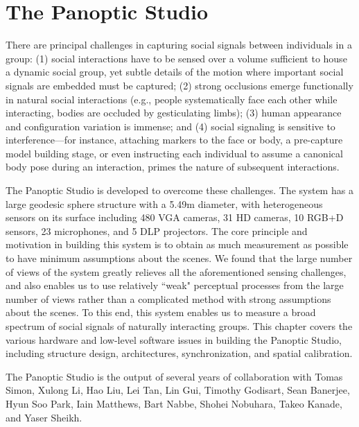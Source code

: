 \chapter{The Panoptic Studio}%
\label{chapter:system}

There are principal challenges in capturing social signals between individuals in a group: (1) social interactions have to be sensed over a volume sufficient to house a dynamic social group, yet subtle details of the motion where important social signals are embedded must be captured; (2) strong occlusions emerge functionally in natural social interactions (e.g., people systematically face each other while interacting, bodies are occluded by gesticulating limbs); (3) human appearance and configuration variation is immense; and (4) social signaling is sensitive to interference---for instance, attaching markers to the face or body, a pre-capture model building stage, or even instructing each individual to assume a canonical body pose during an interaction, primes the nature of subsequent interactions. 

The Panoptic Studio is developed to overcome these challenges. The system has a large geodesic sphere structure with a 5.49m diameter, with heterogeneous sensors on its surface including 480 VGA cameras, 31 HD cameras, 10 RGB+D sensors, 23 microphones, and 5 DLP projectors. The core principle and motivation in building this system is to obtain as much measurement as possible to have minimum assumptions about the scenes. We found that the large number of views of the system greatly relieves all the aforementioned sensing challenges, and also enables us to use relatively ``weak" perceptual processes from the large number of views rather than a complicated method with strong assumptions about the scenes. To this end, this system enables us to measure a broad spectrum of social signals of naturally interacting groups. This chapter covers the various hardware and low-level software issues in building the Panoptic Studio, including structure design, architectures, synchronization, and spatial calibration.  

The Panoptic Studio is the output of several years of collaboration with Tomas Simon, Xulong Li, Hao Liu, Lei Tan, Lin Gui, Timothy Godisart, Sean Banerjee, Hyun Soo Park, Iain Matthews, Bart Nabbe, Shohei Nobuhara, Takeo Kanade, and Yaser Sheikh. 


